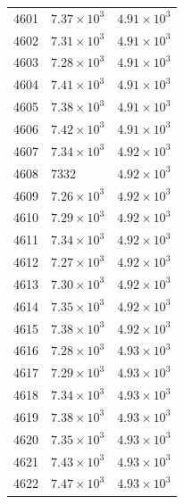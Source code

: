 \begin{table}[H]
\begin{tabular}{lll}
4601 & $\displaystyle 7.37 \times 10^{3}$ & $\displaystyle 4.91 \times 10^{3}$ \\
4602 & $\displaystyle 7.31 \times 10^{3}$ & $\displaystyle 4.91 \times 10^{3}$ \\
4603 & $\displaystyle 7.28 \times 10^{3}$ & $\displaystyle 4.91 \times 10^{3}$ \\
4604 & $\displaystyle 7.41 \times 10^{3}$ & $\displaystyle 4.91 \times 10^{3}$ \\
4605 & $\displaystyle 7.38 \times 10^{3}$ & $\displaystyle 4.91 \times 10^{3}$ \\
4606 & $\displaystyle 7.42 \times 10^{3}$ & $\displaystyle 4.91 \times 10^{3}$ \\
4607 & $\displaystyle 7.34 \times 10^{3}$ & $\displaystyle 4.92 \times 10^{3}$ \\
4608 & 7332 & $\displaystyle 4.92 \times 10^{3}$ \\
4609 & $\displaystyle 7.26 \times 10^{3}$ & $\displaystyle 4.92 \times 10^{3}$ \\
4610 & $\displaystyle 7.29 \times 10^{3}$ & $\displaystyle 4.92 \times 10^{3}$ \\
4611 & $\displaystyle 7.34 \times 10^{3}$ & $\displaystyle 4.92 \times 10^{3}$ \\
4612 & $\displaystyle 7.27 \times 10^{3}$ & $\displaystyle 4.92 \times 10^{3}$ \\
4613 & $\displaystyle 7.30 \times 10^{3}$ & $\displaystyle 4.92 \times 10^{3}$ \\
4614 & $\displaystyle 7.35 \times 10^{3}$ & $\displaystyle 4.92 \times 10^{3}$ \\
4615 & $\displaystyle 7.38 \times 10^{3}$ & $\displaystyle 4.92 \times 10^{3}$ \\
4616 & $\displaystyle 7.28 \times 10^{3}$ & $\displaystyle 4.93 \times 10^{3}$ \\
4617 & $\displaystyle 7.29 \times 10^{3}$ & $\displaystyle 4.93 \times 10^{3}$ \\
4618 & $\displaystyle 7.34 \times 10^{3}$ & $\displaystyle 4.93 \times 10^{3}$ \\
4619 & $\displaystyle 7.38 \times 10^{3}$ & $\displaystyle 4.93 \times 10^{3}$ \\
4620 & $\displaystyle 7.35 \times 10^{3}$ & $\displaystyle 4.93 \times 10^{3}$ \\
4621 & $\displaystyle 7.43 \times 10^{3}$ & $\displaystyle 4.93 \times 10^{3}$ \\
4622 & $\displaystyle 7.47 \times 10^{3}$ & $\displaystyle 4.93 \times 10^{3}$ \\

\end{tabular}
\end{table}
